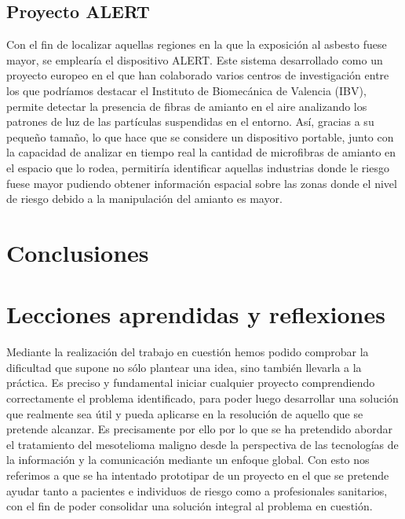 \documentclass{article}
\begin{document}
\subsection{Proyecto ALERT}

Con el fin de localizar aquellas regiones en la que la	exposición  al
asbesto fuese mayor, se emplearía el dispositivo ALERT.  Este  sistema
desarrollado como un proyecto europeo en el que han colaborado	varios
centros de investigación entre los que podríamos destacar el Instituto
de Biomecánica de Valencia (IBV), permite  detectar  la  presencia  de
fibras de amianto en el aire analizando los patrones  de  luz  de  las
partículas suspendidas en el  entorno.	 Así,  gracias	a  su  pequeño
tamaño, lo que hace que se considere un  dispositivo  portable,  junto
con la capacidad de analizar en tiempo real la cantidad de microfibras
de amianto en el espacio que lo rodea, permitiría identificar aquellas
industrias donde le riesgo fuese mayor	pudiendo  obtener  información
espacial sobre las  zonas  donde  el  nivel  de  riesgo  debido  a  la
manipulación del amianto es mayor.

\section{Conclusiones}

\section{Lecciones aprendidas y reflexiones}

Mediante la realización del trabajo en cuestión hemos podido comprobar
la dificultad que supone no  sólo  plantear  una  idea,  sino  también
llevarla a la práctica.  Es preciso y  fundamental  iniciar  cualquier
proyecto comprendiendo correctamente el  problema  identificado,  para
poder luego desarrollar una solución que realmente sea	útil  y  pueda
aplicarse en la resolución de aquello que se  pretende	alcanzar.   Es
precisamente  por  ello  por  lo  que  se  ha  pretendido  abordar  el
tratamiento del  mesotelioma  maligno  desde  la  perspectiva  de  las
tecnologías de la información y la comunicación  mediante  un  enfoque
global.  Con esto nos referimos a que se ha intentado prototipar de un
proyecto en el que se pretende ayudar tanto a pacientes  e  individuos
de riesgo como	a  profesionales  sanitarios,  con  el	fin  de  poder
consolidar  una   solución   integral	al   problema	en   cuestión.
\end{document}
